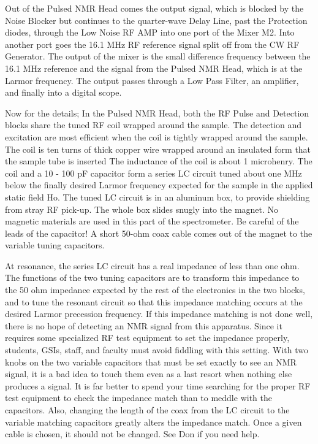 \documentclass{../lab}
\begin{document}
Out of the Pulsed NMR Head comes the output signal, which is blocked by the Noise Blocker but continues to the quarter-wave Delay Line, past the Protection diodes, through the Low Noise RF AMP into one port of the Mixer M2. Into another port goes the 16.1 MHz RF reference signal split off from the CW RF Generator. The output of the mixer is the small difference frequency between the 16.1 MHz reference and the signal from the Pulsed NMR Head, which is at the Larmor frequency. The output passes through a Low Pass Filter, an amplifier, and finally into a digital scope.

Now for the details; In the Pulsed NMR Head, both the RF Pulse and Detection blocks share the tuned RF coil wrapped around the sample. The detection and excitation are most efficient when the coil is tightly wrapped around the sample. The coil is ten turns of thick copper wire wrapped around an insulated form that the sample tube is inserted The inductance of the coil is about 1 microhenry. The coil and a 10 - 100 pF capacitor form a series LC circuit tuned about one MHz below the finally desired Larmor frequency expected for the sample in the applied static field Ho. The tuned LC circuit is in an aluminum box, to provide shielding from stray RF pick-up. The whole box slides snugly into the magnet. No magnetic materials are used in this part of the spectrometer. Be careful of the leads of the capacitor! A short 50-ohm coax cable comes out of the magnet to the variable tuning capacitors.

At resonance, the series LC circuit has a real impedance of less than one ohm. The functions of the two tuning capacitors are to transform this impedance to the 50 ohm impedance expected by the rest of the electronics in the two blocks, and to tune the resonant circuit so that this impedance matching occurs at the desired Larmor precession frequency. If this impedance matching is not done well, there is no hope of detecting an NMR signal from this apparatus. Since it requires some specialized RF test equipment to set the impedance properly, students, GSIs, staff, and faculty must avoid fiddling with this setting. With two knobs on the two variable capacitors that must be set exactly to see an NMR signal, it is a bad idea to touch them even as a last resort when nothing else produces a signal. It is far better to spend your time searching for the proper RF test equipment to check the impedance match than to meddle with the capacitors. Also, changing the length of the coax from the LC circuit to the variable matching capacitors greatly alters the impedance match. Once a given cable is chosen, it should not be changed. See Don if you need help.
\end{document}
